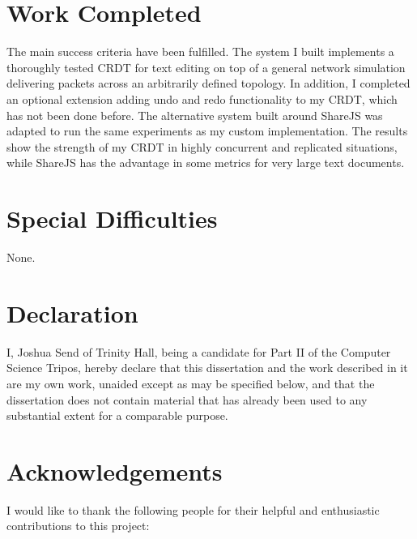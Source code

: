 \documentclass[12pt,a4paper,twoside,openright]{report}
\begin{document}
\section*{Work Completed}

The main success criteria have been fulfilled. The system I built implements a thoroughly tested CRDT for text editing on top of a general network simulation delivering packets across an arbitrarily defined topology. In addition, I completed an optional extension adding undo and redo functionality to my CRDT, which has not been done before. The alternative system built around ShareJS was adapted to run the same experiments as my custom implementation. The results show the strength of my CRDT in highly concurrent and replicated situations, while ShareJS has the advantage in some metrics for very large text documents.

\section*{Special Difficulties}

None.
 
\newpage
\section*{Declaration}

I, Joshua Send of Trinity Hall, being a candidate for Part II of the Computer
Science Tripos, hereby declare that this dissertation and the work described in it are my own work,
unaided except as may be specified below, and that the dissertation
does not contain material that has already been used to any substantial
extent for a comparable purpose.

\bigskip
{}

\medskip
{}

\tableofcontents

\listoffigures

\listoftables

\newpage
\section*{Acknowledgements}

I would like to thank the following people for their helpful and enthusiastic contributions to this project:
\end{document}
